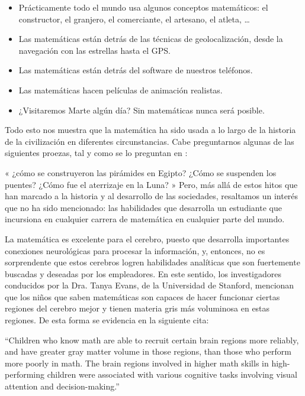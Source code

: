 \begin{itemize}
      
    \color{blue} \item \color{black} Prácticamente todo el mundo usa algunos conceptos matemáticos: el constructor, el granjero, el comerciante, el artesano, el atleta, \ldots
    
    \color{blue} \item \color{black} Las matemáticas están detrás de las técnicas de geolocalización, desde la navegación con  las estrellas hasta el GPS.   
    
    \color{blue} \item \color{black} Las matemáticas están detrás del software de nuestros teléfonos.   
     
      
    \color{blue} \item \color{black} Las matemáticas hacen películas de animación realistas. 
    
    \color{blue} \item \color{black} ¿Visitaremos Marte algún día? Sin matemáticas nunca será posible.
    \end{itemize}

Todo esto nos muestra que la matemática ha sido usada a lo largo de la historia de la civilización en diferentes circunstancias. Cabe preguntarnos algunas de las siguientes proezas, tal y como se lo preguntan en \cite{ReasonsMath2020}: 

    « ¿cómo se construyeron las pirámides en Egipto? ¿Cómo se suspenden los puentes? ¿Cómo fue el aterrizaje en la Luna? » Pero, más allá de estos hitos que han marcado a la historia y al desarrollo de las sociedades, resaltamos un interés que no ha sido mencionado: las habilidades que desarrolla un estudiante que incursiona en cualquier carrera de matemática en cualquier parte del mundo.  

La matemática es excelente para el cerebro, puesto que desarrolla importantes conexiones neurológicas para procesar la información, y, entonces, no es sorprendente que estos cerebros logren habilidades analíticas que son fuertemente buscadas y deseadas por los empleadores. En este sentido, los investigadores conducidos por la Dra. Tanya Evans, de la Universidad de Stanford, mencionan que los niños que saben matemáticas son capaces de hacer funcionar ciertas regiones del cerebro mejor y tienen materia gris más voluminosa en estas regiones.  De esta forma se evidencia
en \cite{evans2015brain} la siguiente cita:

    “Children who know math are able to recruit certain brain regions more reliably, and have greater gray matter volume in those regions, than those who perform more poorly in math. The brain regions involved in higher math skills in high-performing children were associated with various cognitive tasks involving visual attention and decision-making.” 

